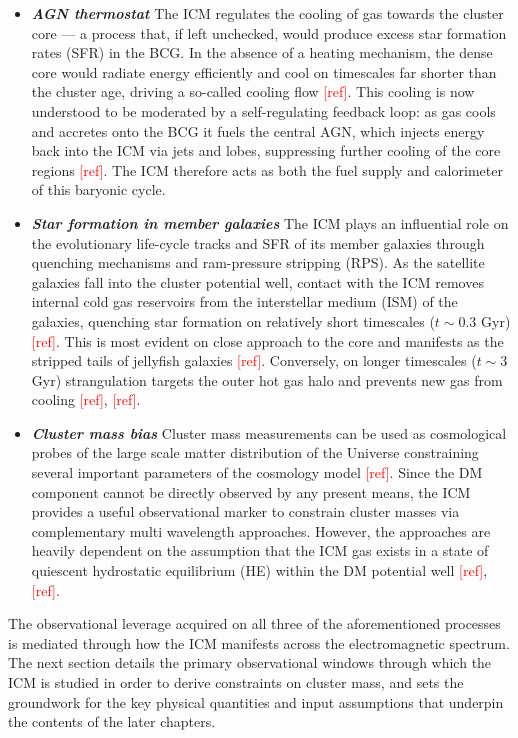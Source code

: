 \begin{itemize}
	\item \textbf{\textit{AGN thermostat}} The ICM regulates the cooling of gas towards the cluster core — a process that, if left unchecked, would produce excess star formation rates (SFR) in the BCG. In the absence of a heating mechanism, the dense core would radiate energy efficiently and cool on timescales far shorter than the cluster age, driving a so-called cooling flow \textcolor{red}{[ref]}. This cooling is now understood to be moderated by a self-regulating feedback loop: as gas cools and accretes onto the BCG it fuels the central AGN, which injects energy back into the ICM via jets and lobes, suppressing further cooling of the core regions \textcolor{red}{[ref]}. The ICM therefore acts as both the fuel supply and calorimeter of this baryonic cycle.
	\item \textbf{\textit{Star formation in member galaxies}} The ICM plays an influential role on the evolutionary life-cycle tracks and SFR of its member galaxies through quenching mechanisms and ram-pressure stripping (RPS). As the satellite galaxies fall into the cluster potential well, contact with the ICM removes internal cold gas reservoirs from the interstellar medium (ISM) of the galaxies, quenching star formation on relatively short timescales ($t \sim 0.3$ Gyr) \textcolor{red}{[ref]}. This is most evident on close approach to the core and manifests as the stripped tails of jellyfish galaxies \textcolor{red}{[ref]}. Conversely, on longer timescales ($t \sim 3$ Gyr) strangulation targets the outer hot gas halo and prevents new gas from cooling \textcolor{red}{[ref]}, \textcolor{red}{[ref]}.
	\item \textbf{\textit{Cluster mass bias}} Cluster mass measurements can be used as cosmological probes of the large scale matter distribution of the Universe constraining several important parameters of the \LCDM cosmology model \textcolor{red}{[ref]}. Since the DM component cannot be directly observed by any present means, the ICM provides a useful observational marker to constrain cluster masses via complementary multi wavelength approaches. However, the approaches are heavily dependent on the assumption that the ICM gas exists in a state of quiescent hydrostatic equilibrium (HE) within the DM potential well \textcolor{red}{[ref]},\textcolor{red}{[ref]}. 	
\end{itemize}

The observational leverage acquired on all three of the aforementioned processes is mediated through how the ICM manifests across the electromagnetic spectrum. The next section details the primary observational windows through which the ICM is studied in order to derive constraints on cluster mass, and sets the groundwork for the key physical quantities and input assumptions that underpin the contents of the later chapters.

